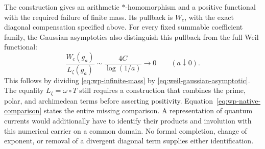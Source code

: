 The construction gives an arithmetic $*$-homomorphism and a positive
functional with the required failure of finite mass.
Its pullback is $W_c$, with the exact diagonal compensation specified above.
For every fixed summable coefficient family, the Gaussian asymptotics
also distinguish this pullback from the full Weil functional:
\[
 \frac{W_c(g_a)}{L_\zeta(g_a)}
 \sim\frac{4C}{\log(1/a)}\longrightarrow0
 \qquad(a\downarrow0).
\]
This follows by dividing \eqref{eq:wp-infinite-mass} by
\eqref{eq:weil-gaussian-asymptotic}.
The equality $L_\zeta=\omega\circ T$ still requires a construction that
combines the prime, polar, and archimedean terms before asserting positivity.
Equation~\eqref{eq:wp-native-comparison} states the entire missing comparison.
A representation of quantum currents would additionally have to identify
their products and involution with this numerical carrier on a common domain.
No formal completion, change of exponent, or removal of a divergent
diagonal term supplies either identification.
